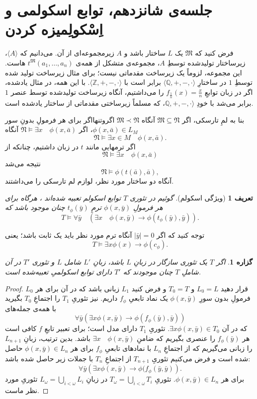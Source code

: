 \documentclass[12pt,a4paper]{report}
\theoremstyle{colorhead}
\newtheorem{prop}[thm]{گزاره}
\newtheorem{defn}[thm]{تعریف}
\begin{document}
\section{جلسه‌ی شانزدهم، توابع اسکولمی و اِسْکولِمیزه کردن}
فرض کنید که
$\mathfrak{M}$
یک 
$L$
ساختار باشد و 
$A$
زیرمجموعه‌ای از آن. می‌دانیم که 
$\langle A\rangle$،
زیرساختار تولیدشده توسطِ 
$A$،
مجموعه‌ی متشکل از همه‌ی
$t^\mathfrak{M}(a_1,\ldots,a_n)$
هاست. این مجموعه،‌ لزوماً یک زیرساخت مقدماتی نیست؛ برای مثال
زیرساخت تولید شده توسطِ
$1$
در ساختارِ
$\langle \mathbb{Q},+,-,\cdot\rangle$
برابر است با
$\langle \mathbb{Z},+,-,\cdot\rangle$.
با این همه، در مثال یادشده، اگر در زبان توابعِ
$f_{\frac{1}{n}}(x)=\frac{x}{n}$
را می‌داشتیم، آنگاه زیرساخت تولیدشده توسط عنصر
$1$
برابر می‌شد با خودِ
$\mathbb{Q},+,-,\cdot\rangle$، 
که مسلماً زیرساختی مقدماتی از ساختار یادشده است.
\par 
بنا به لمِ تارسکی، اگر
$\mathfrak{M}\subseteq \mathfrak{N}$
آنگاه
$\mathfrak{M}\prec \mathfrak{N}$
اگروتنهااگر برای هر فرمولِ بدونِ سور
$\phi(x,\bar{a})\in L_M$،
اگر
$\mathfrak{N}\models \exists x \quad \phi(x,\bar{a})$
آنگاه
\[
\mathfrak{N}\models \exists x\in M\quad \phi(x,\bar{a}).
\]
اگر ترمهایی  مانند
$t$
در زبان داشتیم، چنانکه از
\[
\mathfrak{N}\models \exists x \quad \phi(x,\bar{a})
\]
نتیجه می‌شد
\[
\mathfrak{N}\models \phi(t(\bar{a}),\bar{a}),
\]
آنگاه دو ساختار مورد نظر، لوازم لم تارسکی را می‌داشتند. 
\begin{defn}[ویژگی اسکولم]
گوئیم در
تئوری
$T$
توابع اسکولم تعبیه شده‌اند 
،
هرگاه برای هر فرمولِ
$\phi(x,\bar{y})$
ترمِ
$t_\phi(\bar{y})$
چنان موجود باشد که 
\[
T\models \forall \bar{y}\quad \left( \exists x\quad \phi(x,\bar{y})\to \phi(t_\phi(\bar{y}),\bar{y})\right).
\]
\end{defn}
توجه کنید که اگر
$|\bar{y}|=0$
آنگاه ترم مورد نظر باید یک ثابت باشد؛ یعنی
\[
T\models \exists x \phi(x)\to \phi(c_\phi).
\]
\begin{prop}
اگر 
$T$
یک تئوری سازگار 
در زبانِ
$L$
باشد، 
زبانِ
$L'$
شامل
$L$
و تئوری
$T'$
در آن شاملِ
$T$
چنان موجودند که 
$T'$
دارای توابع اسکولمیِ	 تعبیه‌شده است.
\end{prop}
\begin{proof}
قرار دهید
$L_0=L$
و
$T_0=T$
و فرض کنید
$L_1$
زبانی باشد که در آن برای هر
$L_0$
فرمولِ
بدون سورِ
$\phi(x,\bar{y})$
یک نماد تابعیِ
$f_\phi$
داریم. نیز تئوریِ
$T_1$
را اجتماعِ
$T_0$
بگیرید با همه‌ی جمله‌های
\[
\forall \bar{y}\left(
\exists x \phi(x,\bar{y})\to \phi(f_\phi(\bar{y}),\bar{y})\right)
\]
که در آن
$\exists x \phi(x,\bar{y})\in T_0$.
تئوریِ
$T_1$
دارای مدل است؛ برای تعبیر تابعِ
$f$
کافی است 
هر
$f_\phi(\bar{y})$
را عنصری بگیریم که ضامنِ
$\exists x\quad \phi(x,\bar{y})$
باشد. بدین ترتیب، 
زبانِ
$L_{n+1}$
را زبانی می‌گیریم که از اجتماعِ
$L_n$
با نمادهای تابعیِ
$f_\phi$
برای هر
$\phi(x,\bar{y})\in L_n$
حاصل شده است و فرض می‌کنیم تئوریِ
$T_{n+1}$
از اجتماعِ
$T_n$
با جملات زیر حاصل شده باشد:
\[
\forall\bar{y} \left(\exists x \phi(x,\bar{y})\to \phi(f_\phi(\bar{y},\bar{y})\right).
\]
برای هر
$\phi(x,\bar{y})\in L_n$.
تئوریِ
$T_\omega=\bigcup_{i<\omega} T_i$
در زبانِ
$L_\omega=\bigcup_{i<\omega}L_i$
 تئوریِ مورد نظر ماست. 
\end{proof}
\end{document}
